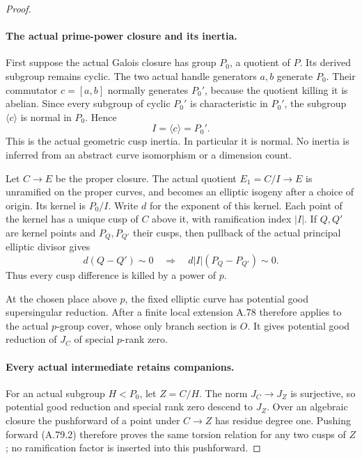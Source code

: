 \begin{proof}
\paragraph{The actual prime-power closure and its inertia.}
First suppose the actual Galois closure has group \(P_0\),
a quotient of \(P\). Its derived subgroup remains cyclic.
The two actual handle generators \(a,b\) generate \(P_0\).
Their commutator \(c=[a,b]\) normally generates \(P_0'\),
because the quotient killing it is abelian. Since every
subgroup of cyclic \(P_0'\) is characteristic in
\(P_0'\), the subgroup \(\langle c\rangle\) is
normal in \(P_0\). Hence
\[
                   I=\langle c\rangle=P_0'.             \tag{A.79.1}
\]
This is the actual geometric cusp inertia. In particular
it is normal. No inertia is inferred from an abstract
curve isomorphism or a dimension count.

Let \(C\to E\) be the proper closure. The actual
quotient \(E_1=C/I\to E\) is unramified on the
proper curves, and becomes an elliptic isogeny after a
choice of origin. Its kernel is \(P_0/I\). Write
\(d\) for the exponent of this kernel. Each point of
the kernel has a unique cusp of \(C\) above it,
with ramification index \(|I|\). If \(Q,Q'\) are
kernel points and \(P_Q,P_{Q'}\) their cusps, then
pullback of the actual principal elliptic divisor gives
\[
 d(Q-Q')\sim0
 \quad\Longrightarrow\quad
 d|I|(P_Q-P_{Q'})\sim0.                                \tag{A.79.2}
\]
Thus every cusp difference is killed by a power of \(p\).

At the chosen place above \(p\), the fixed elliptic
curve has potential good supersingular reduction. After
a finite local extension A.78 therefore applies to the
actual \(p\)-group cover, whose only branch section
is \(O\). It gives potential good reduction of \(J_C\)
of special \(p\)-rank zero.

\paragraph{Every actual intermediate retains companions.}
For an actual subgroup \(H<P_0\), let \(Z=C/H\).
The norm \(J_C\to J_Z\) is surjective, so potential
good reduction and special rank zero descend to \(J_Z\).
Over an algebraic closure the pushforward of a point
under \(C\to Z\) has residue degree one. Pushing
forward (A.79.2) therefore proves the same torsion
relation for any two cusps of \(Z\); no ramification
factor is inserted into this pushforward.


\end{proof}
